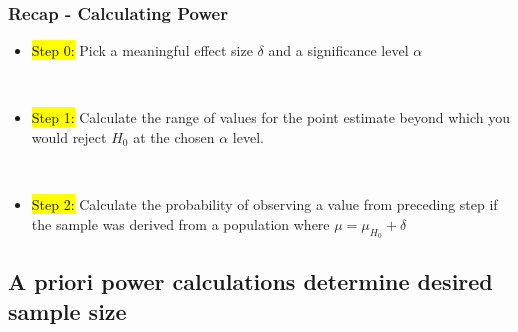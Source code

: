 \documentclass[slidestop,compress,mathserif,12pt,t,professionalfonts,xcolor=table]{beamer}
\begin{document}
\begin{frame}
\frametitle{Recap - Calculating Power}

\begin{itemize}

\item \hl{Step 0:} Pick a meaningful effect size $\delta$ and a significance level $\alpha$

~\\

\item \hl{Step 1:} Calculate the range of values for the point estimate beyond which you would reject $H_0$ at the chosen $\alpha$ level.

~\\

\item \hl{Step 2:} Calculate the probability of observing a value from preceding step if the sample was derived from a population where $\mu = \mu_{H_0}+\delta$

\end{itemize}

\end{frame}



\subsection{A priori power calculations determine desired sample size}
\label{mi6}

\end{document}

